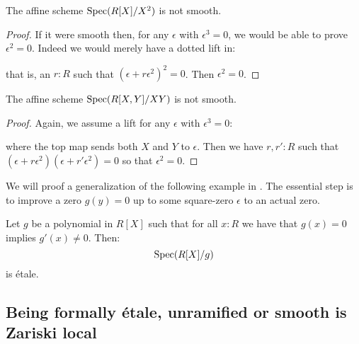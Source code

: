 \begin{example}
The affine scheme $\operatorname{Spec}(R[X]/X^2)$ is not smooth.
\end{example}

\begin{proof}
If it were smooth then, for any $\epsilon$ with $\epsilon^3=0$, we would be able to prove $\epsilon^2=0$.
Indeed we would merely have a dotted lift in:
 \begin{center}
    \end{center}
    that is, an $r:R$ such that $(\epsilon+r\epsilon^2)^2=0$. Then $\epsilon^2=0$.
\end{proof}

\begin{example}
The affine scheme $\operatorname{Spec}(R[X,Y]/XY)$ is not smooth.
\end{example}

\begin{proof}
Again, we assume a lift for any $\epsilon$ with $\epsilon^3=0$:
 \begin{center}
 \end{center}
 where the top map sends both $X$ and $Y$ to $\epsilon$. Then we have $r,r':R$ such that $(\epsilon+r\epsilon^2)(\epsilon+r'\epsilon^2)=0$ so that $\epsilon^2=0$.
\end{proof}

We will proof a generalization of the following example in .
The essential step is to improve a zero $g(y)=0$ up to some square-zero $\epsilon$ to an actual zero.

\begin{example}
Let $g$ be a polynomial in $R[X]$ such that for all $x:R$ we have that $g(x)=0$ implies $g'(x)\not=0$. Then:
\[\operatorname{Spec}(R[X]/g)\]
is étale.
\end{example}


\subsection{Being formally étale, unramified or smooth is Zariski local}


